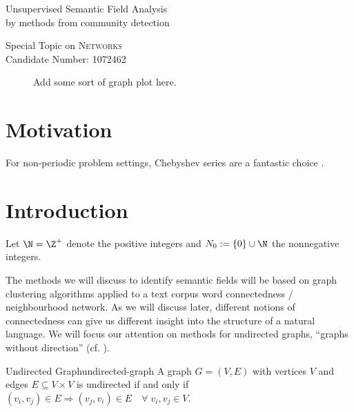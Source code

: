 \documentclass[12pt, a4paper]{article}
\title{\topictitle}
\author{Candidate \candidatenumber}
\date{\today}
\newcommand{\chebyshev}{Chebyshev\xspace}
\newcommand{\topictitle}{Unsupervised Semantic Field Analysis \\ \large by methods from community detection}
\newcommand{\candidatenumber}{1072462}
\newcommand{\course}{Networks}
\begin{document}
  \pagestyle{plain}
  \begin{center}
    \vspace*{-2.5cm}
    \Large \topictitle \\
    \vspace{.3cm}

    \normalsize Special Topic on \textcolor{themecolor3}{\textsc{\course}}\\
    \normalsize Candidate Number: \textcolor{themecolor3}{\candidatenumber}
    \vspace{.3cm}
  \end{center}

  \begin{abstract}
    \label{abstract}
    This work will attempt to
  \end{abstract}

  \begin{figure}[H]
    \centering
    \caption{Add some sort of graph plot here.}
  \end{figure}

  \pagebreak
  \pagestyle{normal}


  \section{Motivation}
  For non-periodic problem settings, \chebyshev series are a fantastic choice \parencite{cw-biemann}.

  \pagebreak
  \section{Introduction}
  Let $\N = \Z^+$ denote the positive integers and $N_0 := \{0\} \cup \N$ the nonnegative integers.

  The methods we will discuss to identify semantic fields will be based on graph clustering algorithms applied to a text corpus word connectedness / neighbourhood network.
  As we will discuss later, different notions of connectedness can give us different insight into the structure of a natural language.
  We will focus our attention on methods for undirected graphs, ``graphs without direction'' (cf. ).
  \begin{definition}{Undirected Graph}{undirected-graph}
    A graph $G = (V, E)$ with vertices $V$ and edges $E \subseteq V \times V$ is undirected if and only if $(v_i, v_j) \in E \Rightarrow (v_j, v_i) \in E \quad \forall\; v_i, v_j \in V$.
  \end{definition}
\end{document}
